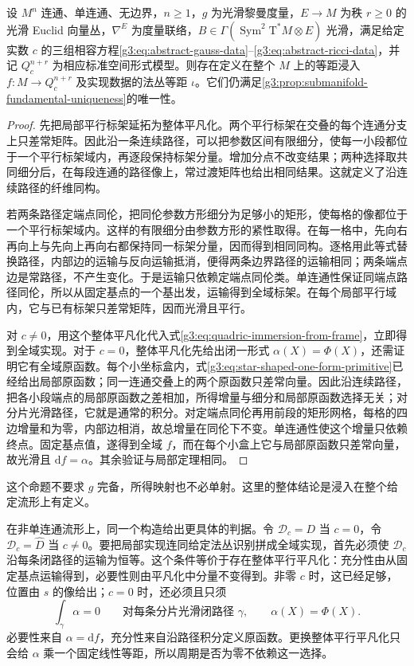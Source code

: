 \begin{proposition}\label{g3:prop:submanifold-fundamental-global}
	设 \(M^n\) 连通、单连通、无边界，\(n\geq1\)，\(g\) 为光滑黎曼度量，\(E\to M\) 为秩 \(r\ge0\) 的光滑 Euclid 向量丛，\(\nabla^E\) 为度量联络，\(B\in\Gamma(\operatorname{Sym}^2\mathrm T^*M\otimes E)\) 光滑，满足给定实数 \(c\) 的三组相容方程\eqref{g3:eq:abstract-gauss-data}--\eqref{g3:eq:abstract-ricci-data}，并记 \(Q_c^{n+r}\) 为相应标准空间形式模型。则存在定义在整个 \(M\) 上的等距浸入 \(f:M\to Q_c^{n+r}\) 及实现数据的法丛等距 \(\iota\)。它们仍满足\cref{g3:prop:submanifold-fundamental-uniqueness}的唯一性。
\end{proposition}
\begin{proof}
	先把局部平行标架延拓为整体平凡化。两个平行标架在交叠的每个连通分支上只差常矩阵。因此沿一条连续路径，可以把参数区间有限细分，使每一小段都位于一个平行标架域内，再逐段保持标架分量。增加分点不改变结果；两种选择取共同细分后，在每段连通的路径像上，常过渡矩阵也给出相同结果。这就定义了沿连续路径的纤维同构。

	若两条路径定端点同伦，把同伦参数方形细分为足够小的矩形，使每格的像都位于一个平行标架域内。这样的有限细分由参数方形的紧性取得。在每一格中，先向右再向上与先向上再向右都保持同一标架分量，因而得到相同同构。逐格用此等式替换路径，内部边的运输与反向运输抵消，便得两条边界路径的运输相同；两条端点边是常路径，不产生变化。于是运输只依赖定端点同伦类。单连通性保证同端点路径同伦，所以从固定基点的一个基出发，运输得到全域标架。在每个局部平行域内，它与已有标架只差常矩阵，因而光滑且平行。

	对 \(c\ne0\)，用这个整体平凡化代入式\eqref{g3:eq:quadric-immersion-from-frame}，立即得到全域实现。对于 \(c=0\)，整体平凡化先给出闭一形式 \(\alpha(X)=\Phi(X)\)，还需证明它有全域原函数。每个小坐标盒内，式\eqref{g3:eq:star-shaped-one-form-primitive}已经给出局部原函数；同一连通交叠上的两个原函数只差常向量。因此沿连续路径，把各小段端点的局部原函数之差相加，所得增量与细分和局部原函数选择无关；对分片光滑路径，它就是通常的积分。对定端点同伦再用前段的矩形网格，每格的四边增量和为零，内部边相消，故总增量在同伦下不变。单连通性使这个增量只依赖终点。固定基点值，遂得到全域 \(f\)，而在每个小盒上它与局部原函数只差常向量，故光滑且 \(\mathrm df=\alpha\)。其余验证与局部定理相同。
\end{proof}

这个命题不要求 \(g\) 完备，所得映射也不必单射。这里的整体结论是浸入在整个给定流形上有定义。

\ProseParagraphBreak

在非单连通流形上，同一个构造给出更具体的判据。令 \(\mathscr D_c=D\) 当 \(c=0\)，令 \(\mathscr D_c=\widehat D\) 当 \(c\ne0\)。要把局部实现连同给定法丛识别拼成全域实现，首先必须使 \(\mathscr D_c\) 沿每条闭路径的运输为恒等。这个条件等价于存在整体平行平凡化：充分性由从固定基点运输得到，必要性则由平凡化中分量不变得到。非零 \(c\) 时，这已经足够，位置由 \(s\) 的像给出；\(c=0\) 时，还必须且只须
\begin{equation}\label{g3:eq:euclidean-development-periods}
	\int_\gamma\alpha=0
	\qquad\text{对每条分片光滑闭路径 }\gamma,
	\qquad\alpha(X)=\Phi(X).
\end{equation}
必要性来自 \(\alpha=\mathrm df\)，充分性来自沿路径积分定义原函数。更换整体平行平凡化只会给 \(\alpha\) 乘一个固定线性等距，所以周期是否为零不依赖这一选择。

